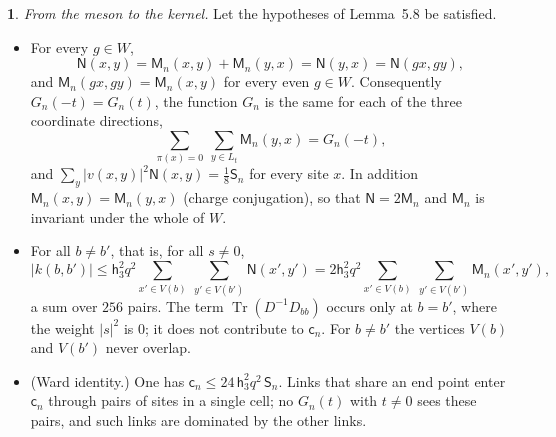 \documentclass[11pt]{amsart}
\newcommand{\namedhead}{}
\theoremstyle{definition}
\newtheorem*{namedinner}{\namedhead}
\newenvironment{named}[1]{\renewcommand{\namedhead}{#1}\begin{namedinner}}{\end{namedinner}}
\begin{document}
\begin{named}{Lemma 5.9}
\emph{From the meson to the kernel.}
Let the hypotheses of Lemma~5.8 be satisfied.
\begin{itemize}
\item[(a)] For every $g\in W$,
\begin{equation*}
\mathsf N(x,y)=\mathsf M_n(x,y)+\mathsf M_n(y,x)=\mathsf N(y,x)=\mathsf N(gx,gy),
\end{equation*}
and $\mathsf M_n(gx,gy)=\mathsf M_n(x,y)$ for every even $g\in W$.
Consequently $G_n(-t)=G_n(t)$, the function $G_n$ is the same for each of the three coordinate directions,
\begin{equation*}
\sum_{\pi(x)=0}\ \sum_{y\in L_t}\mathsf M_n(y,x)=G_n(-t),
\end{equation*}
and $\sum_y|v(x,y)|^2\mathsf N(x,y)=\frac18\mathsf S_n$ for every site $x$.
In addition $\mathsf M_n(x,y)=\mathsf M_n(y,x)$ (charge conjugation), so that $\mathsf N=2\mathsf M_n$ and $\mathsf M_n$ is invariant under the whole of $W$.
\item[(b)] For all $b\ne b'$, that is, for all $s\ne0$,
\begin{equation*}
|k(b,b')|\le\mathsf h_3^2q^2\sum_{x'\in V(b)}\ \sum_{y'\in V(b')}\mathsf N(x',y')=2\mathsf h_3^2q^2\sum_{x'\in V(b)}\ \sum_{y'\in V(b')}\mathsf M_n(x',y'),
\end{equation*}
a sum over $256$ pairs.
The term $\operatorname{Tr}(D^{-1}D_{bb})$ occurs only at $b=b'$, where the weight $|s|^2$ is $0$; it does not contribute to $\mathsf c_n$.
For $b\ne b'$ the vertices $V(b)$ and $V(b')$ never overlap.
\item[(c)] (Ward identity.) One has $\mathsf c_n\le24\,\mathsf h_3^2q^2\,\mathsf S_n$.
Links that share an end point enter $\mathsf c_n$ through pairs of sites in a single cell; no $G_n(t)$ with $t\ne0$ sees these pairs, and such links are dominated by the other links.
\end{itemize}
\end{named}
\end{document}
